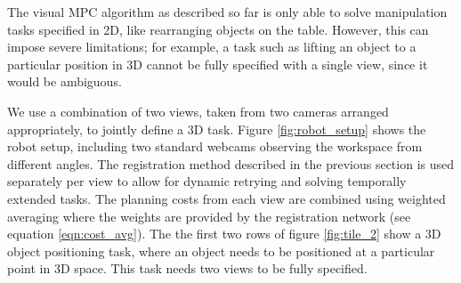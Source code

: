 The visual MPC algorithm as described so far is only able to solve manipulation tasks specified in 2D, like rearranging objects on the table. However, this can impose severe limitations; for example, a task such as lifting an object to a particular position in 3D cannot be fully specified with a single view, since it would be ambiguous. 

We use a combination of two views, taken from two cameras arranged appropriately, to jointly define a 3D task. Figure \ref{fig:robot_setup} shows the robot setup, including two standard webcams observing the workspace from different angles. The registration method described in the previous section is used separately per view to allow for dynamic retrying and solving temporally extended tasks. The planning costs from each view are combined using weighted averaging where the weights are provided by the registration network (see equation \ref{eqn:cost_avg}). The the first two rows of figure \ref{fig:tile_2} show a 3D object positioning task, where an object needs to be positioned at a particular point in 3D space. This task needs two views to be fully specified.





